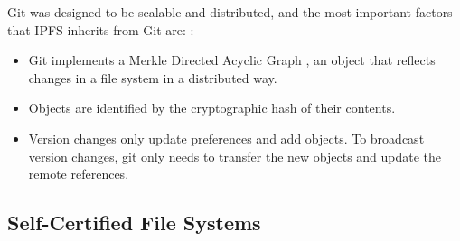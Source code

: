 Git was designed to be scalable and distributed, and the most important factors
that IPFS inherits from Git are: \cite{benet2014ipfs}:

\begin{itemize}
\item Git implements a Merkle Directed Acyclic Graph
  \cite{bleichenbacher1994directed}, an object that reflects changes in a file
  system in a distributed way.
\item Objects are identified by the cryptographic hash of their contents.
\item Version changes only update preferences and add objects. To broadcast
  version changes, git only needs to transfer the new objects and update the
  remote references.
\end{itemize}

\subsection{Self-Certified File Systems}




